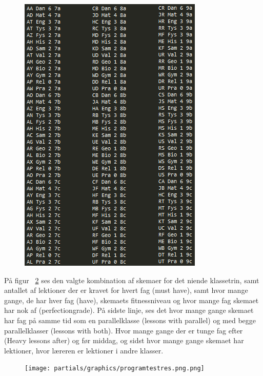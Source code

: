 \begin{figure}[!h]
  \includegraphics[width=\textwidth]{partials/graphics/programtestinfo.png}
  \caption{}
  \label{fig:info}
\end{figure}

På figur ~\ref{fig:test} ses den valgte kombination af skemaer for det niende klassetrin, samt antallet af lektioner der er kravet for hvert fag (must have), samt hvor mange gange, de har hver fag (have), skemaets fitnessniveau og hvor mange fag skemaet har nok af (perfectiongrade). På sidste linje, ses det hvor mange gange skemaet har fag på samme tid som en parallelklasse (lessons with parallel) og med begge parallelklasser (lessons with both). Hvor mange gange der er tunge fag efter (Heavy lessons after) og før middag, og sidst hvor mange gange skemaet har lektioner, hvor læreren er lektioner i andre klasser.

\begin{figure}[!h]
  \texttt{[image: partials/graphics/programtestres.png.png]}
  \caption{}
  \label{fig:test}
\end{figure}